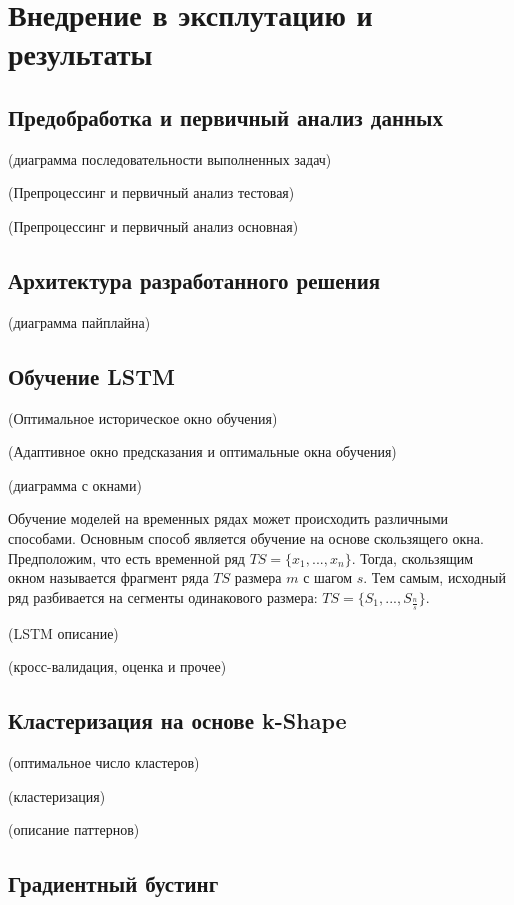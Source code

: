 \section{Внедрение в эксплутацию и результаты}

\subsection{Предобработка и первичный анализ данных}

(диаграмма последовательности выполненных задач)

(Препроцессинг и первичный анализ тестовая)

(Препроцессинг и первичный анализ основная)


\subsection{Архитектура разработанного решения}

(диаграмма пайплайна)


\subsection{Обучение LSTM}

(Оптимальное историческое окно обучения)

(Адаптивное окно предсказания и оптимальные окна обучения)

(диаграмма с окнами)

Обучение моделей на временных рядах может происходить различными способами.
Основным способ является обучение на основе скользящего окна.
Предположим, что есть временной ряд $TS = \{x_1, ..., x_n\}$.
Тогда, скользящим окном называется фрагмент ряда $TS$ размера $m$ с шагом $s$.
Тем самым, исходный ряд разбивается на сегменты одинакового размера: $TS = \{S_1, ..., S_{\frac{n}{s}}\}$.

(LSTM описание)

(кросс-валидация, оценка и прочее)

\subsection{Кластеризация на основе k-Shape}

(оптимальное число кластеров)

(кластеризация)

(описание паттернов)

\subsection{Градиентный бустинг}

